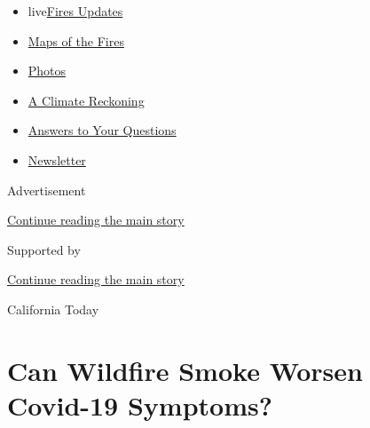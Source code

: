 \begin{itemize}
\tightlist
\item
  live\href{https://www.nytimes3xbfgragh.onion/2020/09/12/us/wildfires-live-updates.html?name=styln-california-wildfires\&region=TOP_BANNER\&block=storyline_menu_recirc\&action=click\&pgtype=Article\&impression_id=6e55b151-f52b-11ea-973c-a7164f8a6e9d\&variant=undefined}{Fires
  Updates}
\item
  \href{https://www.nytimes3xbfgragh.onion/interactive/2020/us/fires-map-tracker.html?name=styln-california-wildfires\&region=TOP_BANNER\&block=storyline_menu_recirc\&action=click\&pgtype=Article\&impression_id=6e55b152-f52b-11ea-973c-a7164f8a6e9d\&variant=undefined}{Maps
  of the Fires}
\item
  \href{https://www.nytimes3xbfgragh.onion/article/wildfires-photos-california-oregon-washington-state.html?name=styln-california-wildfires\&region=TOP_BANNER\&block=storyline_menu_recirc\&action=click\&pgtype=Article\&impression_id=6e55b153-f52b-11ea-973c-a7164f8a6e9d\&variant=undefined}{Photos}
\item
  \href{https://www.nytimes3xbfgragh.onion/2020/09/10/us/climate-change-california-wildfires.html?name=styln-california-wildfires\&region=TOP_BANNER\&block=storyline_menu_recirc\&action=click\&pgtype=Article\&impression_id=6e5c6810-f52b-11ea-973c-a7164f8a6e9d\&variant=undefined}{A
  Climate Reckoning}
\item
  \href{https://www.nytimes3xbfgragh.onion/article/wildfires-california-oregon-washington.html?name=styln-california-wildfires\&region=TOP_BANNER\&block=storyline_menu_recirc\&action=click\&pgtype=Article\&impression_id=6e5c8f20-f52b-11ea-973c-a7164f8a6e9d\&variant=undefined}{Answers
  to Your Questions}
\item
  \href{https://www.nytimes3xbfgragh.onion/2020/09/09/us/california-wildfires.html?name=styln-california-wildfires\&region=TOP_BANNER\&block=storyline_menu_recirc\&action=click\&pgtype=Article\&impression_id=6e5c8f21-f52b-11ea-973c-a7164f8a6e9d\&variant=undefined}{Newsletter}
\end{itemize}

Advertisement

\protect\hyperlink{after-top}{Continue reading the main story}

Supported by

\protect\hyperlink{after-sponsor}{Continue reading the main story}

California Today

\hypertarget{can-wildfire-smoke-worsen-covid-19-symptoms}{%
\section{Can Wildfire Smoke Worsen Covid-19
Symptoms?}\label{can-wildfire-smoke-worsen-covid-19-symptoms}}


